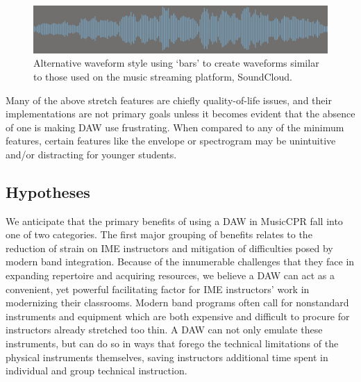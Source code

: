 \documentclass[manuscript,screen,review]{acmart}
\begin{document}
\begin{figure}[H]
    \centering
    \includegraphics[width=\linewidth]{proposal//images/daw-bars-4.png}
    \caption{Alternative waveform style using `bars' to create waveforms similar to those used on the music streaming platform, SoundCloud.}
        \label{fig:soundcloud}
\end{figure}

Many of the above stretch features are chiefly quality-of-life issues, and their implementations are not primary goals unless it becomes evident that the absence of one is making DAW use frustrating. When compared to any of the minimum features, certain features like the envelope or spectrogram may be unintuitive and/or distracting for younger students.

\subsection{Hypotheses}
We anticipate that the primary benefits of using a DAW in MusicCPR fall into one of two categories.
The first major grouping of benefits relates to the reduction of strain on IME instructors and mitigation of difficulties posed by modern band integration.
Because of the innumerable challenges that they face in expanding repertoire and acquiring resources, we believe a DAW can act as a convenient, yet powerful facilitating factor for IME instructors' work in modernizing their classrooms.
Modern band programs often call for nonstandard instruments and equipment which are both expensive and difficult to procure for instructors already stretched too thin.
A DAW can not only emulate these instruments, but can do so in ways that forego the technical limitations of the physical instruments themselves, saving instructors additional time spent in individual and group technical instruction. 
\end{document}
